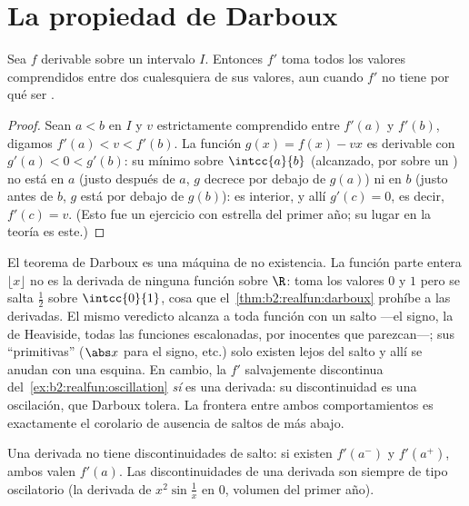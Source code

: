 \section{La propiedad de Darboux}

\begin{theorem}[Darboux]\label{thm:b2:realfun:darboux}
Sea $f$ derivable sobre un intervalo $I$. Entonces $f'$ toma todos
los valores comprendidos entre dos cualesquiera de sus valores, aun
cuando $f'$ no tiene por qué ser
.
\end{theorem}

\begin{proof}
Sean $a < b$ en $I$ y $v$ estrictamente comprendido entre $f'(a)$ y
$f'(b)$, digamos $f'(a) < v < f'(b)$. La función $g(x) = f(x) - vx$
es derivable con $g'(a) < 0 < g'(b)$: su mínimo sobre $\intcc{a}{b}$
(alcanzado, por  sobre un ) no está en $a$
(justo después de $a$, $g$ decrece por debajo de $g(a)$) ni en $b$
(justo antes de $b$, $g$ está por debajo de $g(b)$): es interior, y
allí $g'(c) = 0$, es decir, $f'(c) = v$. (Esto fue un ejercicio con
estrella del primer año; su lugar en la teoría es este.)
\end{proof}

\begin{example}\label{ex:b2:realfun:whichderivatives}
El teorema de Darboux es una máquina de no existencia. La función
parte entera $\lfloor x\rfloor$ no es la derivada de ninguna función
sobre $\R$: toma los valores $0$ y $1$ pero se salta $\frac12$ sobre
$\intcc{0}{1}$, cosa que el~\cref{thm:b2:realfun:darboux} prohíbe a
las derivadas. El mismo veredicto alcanza a toda función con un
salto ---el signo, la de Heaviside, todas las funciones escalonadas,
por inocentes que parezcan---; sus ``primitivas'' ($\abs x$ para el
signo, etc.) solo existen lejos del salto y allí se anudan con una
esquina. En cambio, la $f'$ salvajemente discontinua del~\cref{ex:b2:realfun:oscillation} \emph{sí} es una derivada: su
discontinuidad es una oscilación, que Darboux tolera. La frontera
entre ambos comportamientos es exactamente el corolario de ausencia
de saltos de más abajo.
\end{example}

\begin{corollary}\label{cor:b2:realfun:nojumps}
Una derivada no tiene discontinuidades de salto: si existen
$f'(a^-)$ y $f'(a^+)$, ambos valen $f'(a)$. Las discontinuidades de
una derivada son siempre de tipo oscilatorio (la derivada de
$x^2\sin\frac1x$ en $0$, volumen del primer año).
\end{corollary}

